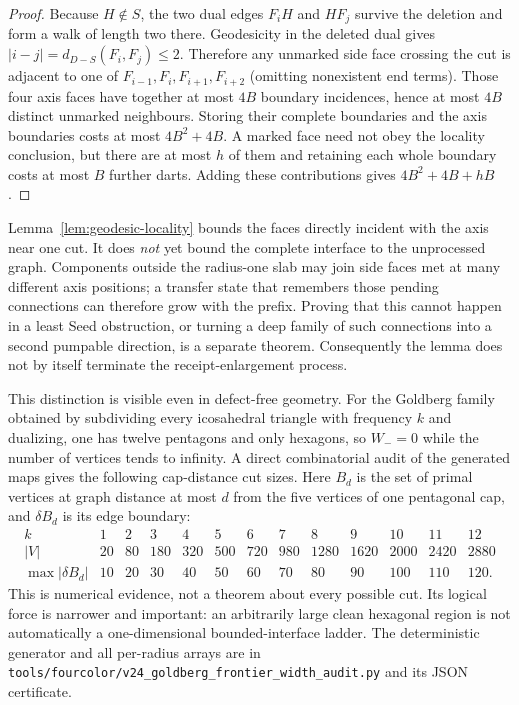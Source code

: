 \begin{proof}
Because $H\notin S$, the two dual edges $F_iH$ and $HF_j$ survive the
deletion and form a walk of length two there.  Geodesicity in the deleted
dual gives $|i-j|=d_{D-S}(F_i,F_j)\le2$.  Therefore any unmarked side face
crossing the cut is adjacent to one of
$F_{i-1},F_i,F_{i+1},F_{i+2}$ (omitting nonexistent end terms).  Those four
axis faces have together at most $4B$ boundary incidences, hence at most
$4B$ distinct unmarked neighbours.  Storing their complete boundaries and
the axis boundaries costs
at most $4B^2+4B$.  A marked face need not obey the locality conclusion, but
there are at most $h$ of them and retaining each whole boundary costs at most
$B$ further darts.  Adding these contributions gives $4B^2+4B+hB$.
\end{proof}

Lemma~\ref{lem:geodesic-locality} bounds the faces directly incident with the
axis near one cut.  It does \emph{not} yet bound the complete interface to the
unprocessed graph.  Components outside the radius-one slab may join side
faces met at many different axis positions; a transfer state that remembers
those pending connections can therefore grow with the prefix.  Proving that
this cannot happen in a least Seed obstruction, or
turning a deep family of such connections into a second pumpable direction,
is a separate theorem.  Consequently the lemma does not by itself terminate
the receipt-enlargement process.

This distinction is visible even in defect-free geometry.  For the Goldberg
family obtained by subdividing every icosahedral triangle with frequency
\(k\) and dualizing, one has twelve pentagons and only hexagons, so \(W_-=0\)
while the number of vertices tends to infinity.  A direct combinatorial audit
of the generated maps gives the following cap-distance cut sizes.  Here
\(B_d\) is the set of primal vertices at graph distance at most \(d\) from
the five vertices of one pentagonal cap, and \(\delta B_d\) is its edge
boundary:
\[
\begin{array}{c|rrrrrrrrrrrr}
k&1&2&3&4&5&6&7&8&9&10&11&12\\ \hline
|V|&20&80&180&320&500&720&980&1280&1620&2000&2420&2880\\
\max |\delta B_d|&10&20&30&40&50&60&70&80&90&100&110&120.
\end{array}
\]
This is numerical evidence, not a theorem about every possible cut.  Its
logical force is narrower and important: an arbitrarily large clean
hexagonal region is not automatically a one-dimensional bounded-interface
ladder.  The deterministic generator and all per-radius arrays are in
\texttt{tools/fourcolor/v24\_goldberg\_frontier\_width\_audit.py} and its
JSON certificate.

